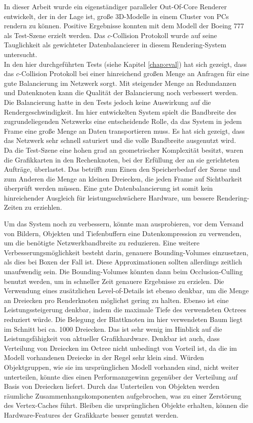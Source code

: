 In dieser Arbeit wurde ein eigenständiger paralleler Out-Of-Core Renderer entwickelt, der in der Lage ist, große 3D-Modelle in einem Cluster von PCs rendern zu können. Positive Ergebnisse konnten mit dem Modell der Boeing 777 als Test-Szene erzielt werden. Das $c$-Collision Protokoll wurde auf seine Tauglichkeit als gewichteter Datenbalancierer in diesem Rendering-System untersucht. \\
In den hier durchgeführten Tests (siehe Kapitel \ref{chap:eval}) hat sich gezeigt, dass das $c$-Collision Protokoll bei einer hinreichend großen Menge an Anfragen für eine gute Balancierung im Netzwerk sorgt. Mit steigender Menge an Redundanzen und Datenknoten kann die Qualität der Balancierung noch verbessert werden. Die Balancierung hatte in den Tests jedoch keine Auswirkung auf die Rendergeschwindigkeit. Im hier entwickelten System spielt die Bandbreite des zugrundeliegenden Netzwerks eine entscheidende Rolle, da das System in jedem Frame eine große Menge an Daten transportieren muss. Es hat sich gezeigt, dass das Netzwerk sehr schnell saturiert und die volle Bandbreite ausgenutzt wird. \\
Da die Test-Szene eine hohen grad an geometrischer Komplexität besitzt, waren die Grafikkarten in den Rechenknoten, bei der Erfüllung der an sie gerichteten Aufträge, überlastet. Das betrifft zum Einen den Speicherbedarf der Szene und zum Anderen die Menge an kleinen Dreiecken, die jeden Frame auf Sichtbarkeit überprüft werden müssen. Eine gute Datenbalancierung ist somit kein hinreichender Ausgleich für leistungsschwächere Hardware, um bessere Rendering-Zeiten zu erziehlen. 

Um das System noch zu verbessern, könnte man ausprobieren, vor dem Versand von Bildern, Objekten und Tiefenbuffern eine Datenkompression zu verwenden, um die benötigte Netzwerkbandbreite zu reduzieren. Eine weitere Verbesserungsmöglichkeit besteht darin, genauere Bounding-Volumes einzusetzen, als dies bei Boxen der Fall ist. Diese Approximationen sollten allerdings zeitlich unaufwendig sein. Die Bounding-Volumes könnten dann beim Occlusion-Culling benutzt werden, um in schneller Zeit genauere Ergebnisse zu erzielen. Die Verwendung eines zusätzlichen Level-of-Details ist ebenso denkbar, um die Menge an Dreiecken pro Renderknoten möglichst gering zu halten. Ebenso ist eine Leistungssteigerung denkbar, indem die maximale Tiefe des verwendeten Octrees reduziert würde. Die Belegung der Blattknoten im hier verwendeten Baum liegt im Schnitt bei ca. 1000 Dreiecken. Das ist sehr wenig im Hinblick auf die Leistungsfähigkeit von aktueller Grafikhardware. Denkbar ist auch, dass Verteilung von Dreiecken im Octree nicht unbedingt von Vorteil ist, da die im Modell vorhandenen Dreiecke in der Regel sehr klein sind. Würden Objektgruppen, wie sie im ursprünglichen Modell vorhanden sind, nicht weiter unterteilen, könnte dies einen Performanzgewinn gegenüber der Verteilung auf Basis von Dreiecken liefert. Durch das Unterteilen von Objekten werden räumliche Zusammenhangskomponenten aufgebrochen, was zu einer Zerstörung des Vertex-Caches führt. Bleiben die ursprünglichen Objekte erhalten, können die Hardware-Features der Grafikkarte besser genutzt werden.

%
%
